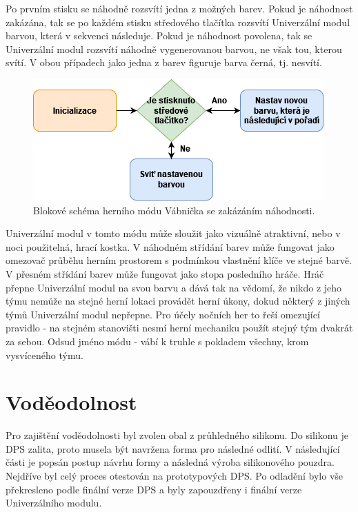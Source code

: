 Po prvním stisku se náhodně rozsvítí jedna z možných barev. Pokud je náhodnost zakázána, tak se po každém stisku středového tlačítka rozsvítí Univerzální modul barvou, která v sekvenci následuje. Pokud 
je náhodnost povolena, tak se Univerzální modul rozsvítí náhodně vygenerovanou barvou, ne však tou, kterou svítí. V obou případech jako jedna z barev figuruje barva černá, tj. nesvítí. 

\begin{figure}[!h]
  \begin{center}
    \includegraphics[scale=0.75]{obrazky/Vabnicka_diagram.png}
  \end{center}
  \caption[Blokové schéma herního módu Vábnička se zakázáním náhodnosti]{Blokové schéma herního módu Vábnička se zakázáním náhodnosti.}
\end{figure}

Univerzální modul v tomto módu může sloužit jako vizuálně atraktivní, nebo v noci použitelná, hrací kostka. V náhodném střídání barev může fungovat jako omezovač průběhu herním prostorem s podmínkou 
vlastnění klíče ve stejné barvě. V přesném střídání barev může fungovat jako stopa posledního hráče. Hráč přepne Univerzální modul na svou barvu a dává tak na vědomí, že nikdo z jeho týmu nemůže na 
stejné herní lokaci provádět herní úkony, dokud některý z jiných týmů Univerzální modul nepřepne. Pro účely nočních her to řeší omezující pravidlo - na stejném stanovišti nesmí herní mechaniku použít 
stejný tým dvakrát za sebou. Odsud jméno módu - vábí k truhle s pokladem všechny, krom vysvíceného týmu.

\chapter{Voděodolnost}
Pro zajištění voděodolnosti byl zvolen obal z průhledného silikonu. Do silikonu je DPS zalita, proto musela být navržena forma pro následné odlití. V následující části je popsán postup 
návrhu formy a následná výroba silikonového pouzdra. Nejdříve byl celý proces otestován na prototypových DPS. Po odladění bylo vše překresleno podle finální verze DPS a byly zapouzdřeny
i finální verze Univerzálního modulu.  

